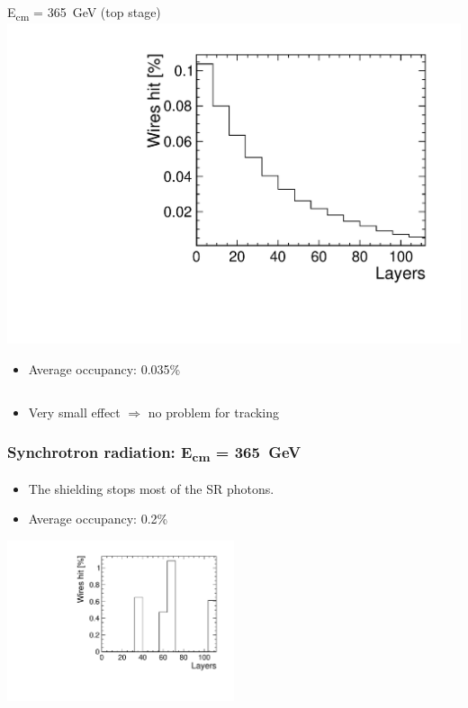 \documentclass[hyperref={colorlinks=true,pdfpagelabels=false,linkcolor=black}, xcolor=dvipsnames,10pt]{beamer}
\begin{document}
\begin{frame}
\begin{columns}
    \begin{block}{E\textsubscript{cm} = 365~GeV (top stage)}
      \centering
      \includegraphics[width=\textwidth]{./figures/Hadrons_SL_Top.pdf}

      \begin{itemize}
        \item Average occupancy: 0.035\%
      \end{itemize}

    \end{block}
  \end{columns}

  \begin{itemize}
    \item Very small effect $\Rightarrow$ no problem for tracking
  \end{itemize}

\end{frame}

\begin{frame}
	\frametitle{Synchrotron radiation: E\textsubscript{cm} = 365~GeV}

  \begin{itemize}
    \item The shielding stops most of the SR photons.
    \item Average occupancy: 0.2\%
  \end{itemize}
  \centering
  \includegraphics[width=0.5\textwidth]{./figures/SR_SL.pdf}

\end{frame}
\end{document}
